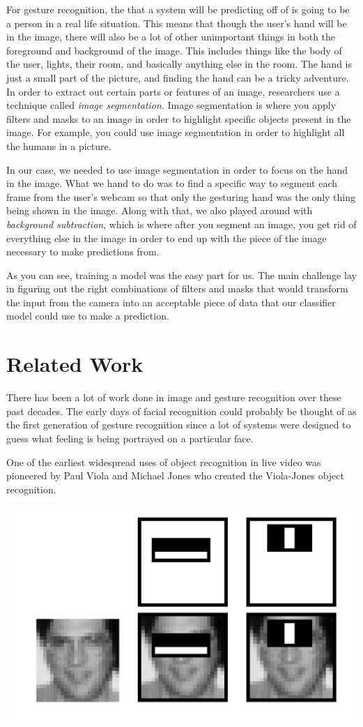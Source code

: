 \documentclass[letterpaper]{article} %
\begin{document}
For gesture recognition, the that a system will be predicting off of is going to be a person in a real life situation. This means that though the user's hand will be in the image, there will also be a lot of other unimportant things in both the foreground and background of the image. This includes things like the body of the user, lights, their room, and basically anything else in the room. The hand is just a small part of the picture, and finding the hand can be a tricky adventure. In order to extract out certain parts or features of an image, researchers use a technique called \textit{image segmentation}. Image segmentation is where you apply filters and masks to an image in order to highlight specific objects present in the image. For example, you could use image segmentation in order to highlight all the humans in a picture.

In our case, we needed to use image segmentation in order to focus on the hand in the image. What we hand to do was to find a specific way to segment each frame from the user's webcam so that only the gesturing hand was the only thing being shown in the image. Along with that, we also played around with \textit{background subtraction}, which is where after you segment an image, you get rid of everything else in the image in order to end up with the piece of the image necessary to make predictions from. 

As you can see, training a model was the easy part for us. The main challenge lay in figuring out the right combinations of filters and masks that would transform the input from the camera into an acceptable piece of data that our classifier model could use to make a prediction.

\section{Related Work}
There has been a lot of work done in image and gesture recognition over these past decades. The early days of facial recognition could probably be thought of as the first generation of gesture recognition since a lot of systems were designed to guess what feeling is being portrayed on a particular face. 

One of the earliest widespread uses of object recognition in live video was pioneered by Paul Viola and Michael Jones who created the Viola-Jones object recognition.

\includegraphics[scale=0.53]{violajones}
\end{document}
